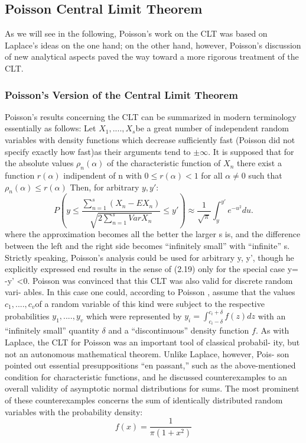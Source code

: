 \documentclass{article}
\begin{document}
\subsection{ Poisson Central Limit Theorem}
As we will see in the following, Poisson’s work on the CLT was based on Laplace’s ideas on the one hand; on the other hand, however, Poisson’s discussion of new analytical aspects paved the way toward a more rigorous treatment of the CLT.

\subsubsection{Poisson’s Version of the Central Limit Theorem}
Poisson’s results concerning the CLT can be summarized in modern terminology
essentially as follows:
Let $X_1,....,X_s $be a great number of independent random variables with density functions which decrease sufficiently fast (Poisson did not specify exactly how fast)as their arguments tend to $ \pm \infty$.
It is supposed that for the absolute values $\rho_n(\alpha) $ of the characteristic function of $X_n$ there exist a function $r(\alpha)$ indipendent of n with $ 0 \leq r(\alpha) < 1 $ for all $\alpha \neq 0$ such that $\rho_n (\alpha) \leq r(\alpha) $ Then, for arbitrary $ y,y' $:
\[   P(y\leq \frac{\sum_{n=1}^s(X_n - EX_n)  }{\sqrt{2\sum_{n=1}^s VarX_n}}   \leq y' )  \approx \frac{1}{\sqrt{\pi}} \int_y^{y'} e^{-u^2} du.  \]
where the approximation becomes all the better the larger s is, and the difference between the left and the right side becomes “infinitely small” with “infinite” s. Strictly speaking, Poisson’s analysis could be used for arbitrary y, y', though he explicitly expressed end results in the sense of (2.19) only for the special case y= -y' <0.
Poisson was convinced that this CLT was also valid for discrete random vari-
ables. In this case one could, according to Poisson \cite{Dodge2008Concise}, assume that the
values $c_1 ,....,c_v$of a random variable of this kind were subject to the respective
probabilities $y_1,....,y_v $ which were represented by $y_i = \int_{c_i -\delta}^{c_i +\delta} f(z)dz$
 with an “infinitely small” quantity $\delta$ and a “discontinuous” density function $f$.
As with Laplace, the CLT for Poisson was an important tool of classical probabil-
ity, but not an autonomous mathematical theorem. Unlike Laplace, however, Pois-
son pointed out essential presuppositions “en passant,” such as the above-mentioned condition  for characteristic functions, and he discussed counterexamples to an overall validity of asymptotic normal distributions for sums. The most prominent of these counterexamples \cite{Fischer2010History} concerns the sum of identically distributed random variables with the probability density:
\[f(x)= \frac{1}{\pi (1+x^2)}\]
\end{document}
